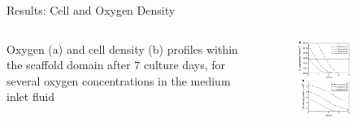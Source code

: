 \documentclass[11pt,t]{beamer}
\begin{document}
\begin{frame}[fragile]{Results: Cell and Oxygen Density}  

	\begin{columns}[t]
		\begin{column}{.5\textwidth}
 Oxygen (a) and cell density (b) profiles within the scaffold domain after 7 culture days, for several oxygen concentrations in the medium inlet fluid
	
 
		\end{column}
		\begin{column}{.5\textwidth}
			\vspace{-30pt}
			\begin{figure}
			\centering
			\includegraphics[width=0.6\textwidth]{math_tot_den}
			
			\end{figure}
		\end{column}
	\end{columns}	
		
\end{frame}
\end{document}
